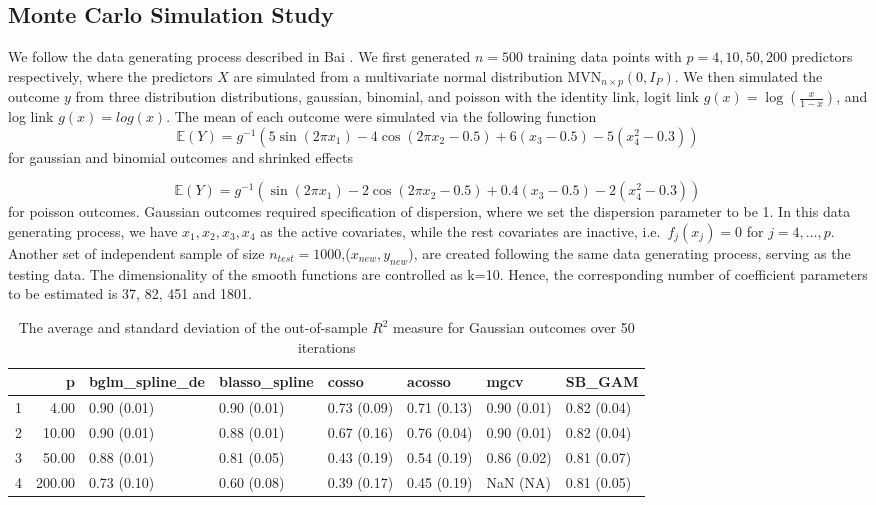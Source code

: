 \documentclass[AMA,STIX1COL,]{WileyNJD-v2}
\begin{document}
\hypertarget{monte-carlo-simulation-study}{%
\subsection{Monte Carlo Simulation
Study}\label{monte-carlo-simulation-study}}

We follow the data generating process described in Bai \citep{Bai2021}.
We first generated \(n=500\) training data points with
\(p=4, 10, 50, 200\) predictors respectively, where the predictors \(X\)
are simulated from a multivariate normal distribution
\(\text{MVN}_{n\times p}(0, I_{P})\). We then simulated the outcome
\(y\) from three distribution distributions, gaussian, binomial, and
poisson with the identity link, logit link
\(g(x) = \log(\frac{x}{1-x})\), and log link \(g(x) = log(x)\). The mean
of each outcome were simulated via the following function \[
\mathbb{E}(Y) = g^{-1}(5 \sin(2\pi x_1) - 4 \cos(2\pi x_2 -0.5) + 6(x_3-0.5) - 5(x_4^2 -0.3))
\] for gaussian and binomial outcomes and shrinked effects

\[
\mathbb{E}(Y) = g^{-1}(\sin(2\pi x_1) - 2\cos(2\pi x_2 -0.5) + 0.4(x_3-0.5) - 2(x_4^2 -0.3))
\] for poisson outcomes. Gaussian outcomes required specification of
dispersion, where we set the dispersion parameter to be 1. In this data
generating process, we have \(x_1, x_2, x_3, x_4\) as the active
covariates, while the rest covariates are inactive,
i.e.~\(f_j(x_j) = 0\) for \(j = 4, \dots, p\). Another set of
independent sample of size \(n_{test}=1000\),(\(x_{new} ,y_{new}\)), are
created following the same data generating process, serving as the
testing data. The dimensionality of the smooth functions are controlled
as k=10. Hence, the corresponding number of coefficient parameters to be
estimated is 37, 82, 451 and 1801.

\begin{table}[ht]
\centering
\begin{tabular}{rrllllll}
  \hline
 & p & bglm\_spline\_de & blasso\_spline & cosso & acosso & mgcv & SB\_GAM \\ 
  \hline
1 & 4.00 & 0.90 (0.01) & 0.90 (0.01) & 0.73 (0.09) & 0.71 (0.13) & 0.90 (0.01) & 0.82 (0.04) \\ 
  2 & 10.00 & 0.90 (0.01) & 0.88 (0.01) & 0.67 (0.16) & 0.76 (0.04) & 0.90 (0.01) & 0.82 (0.04) \\ 
  3 & 50.00 & 0.88 (0.01) & 0.81 (0.05) & 0.43 (0.19) & 0.54 (0.19) & 0.86 (0.02) & 0.81 (0.07) \\ 
  4 & 200.00 & 0.73 (0.10) & 0.60 (0.08) & 0.39 (0.17) & 0.45 (0.19) & NaN (NA) & 0.81 (0.05) \\ 
   \hline
\end{tabular}
\caption{The average and standard deviation of the out-of-sample $R^2$ measure for Gaussian outcomes over 50 iterations} 
\label{tab:gaus}
\end{table}
\end{document}
